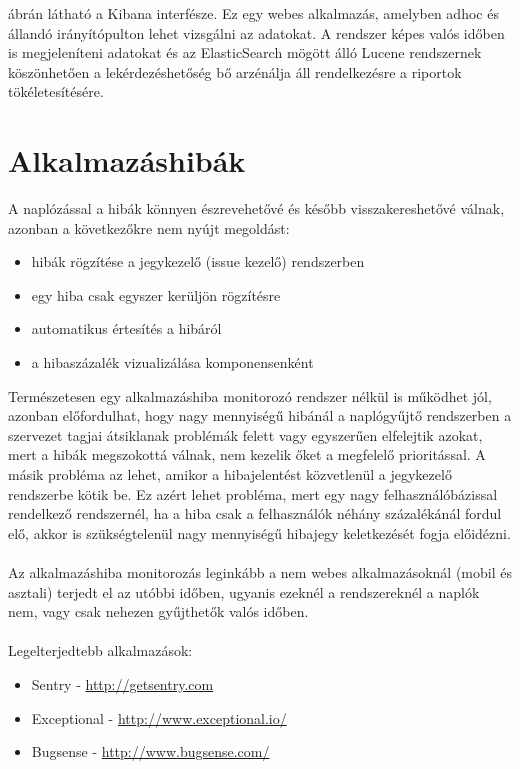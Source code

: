  ábrán látható a Kibana interfésze. Ez egy webes alkalmazás, amelyben adhoc és állandó irányítópulton lehet vizsgálni az adatokat. A rendszer képes valós időben is megjeleníteni adatokat és az ElasticSearch mögött álló Lucene rendszernek köszönhetően a lekérdezéshetőség bő arzénálja áll rendelkezésre a riportok tökéletesítésére.

\section{Alkalmazáshibák}
A naplózással a hibák könnyen észrevehetővé és később visszakereshetővé válnak, azonban a következőkre nem nyújt megoldást:\\
\begin{itemize}
\item hibák rögzítése a jegykezelő (issue kezelő) rendszerben
\item egy hiba csak egyszer kerüljön rögzítésre
\item automatikus értesítés a hibáról
\item a hibaszázalék vizualizálása komponensenként
\end{itemize}

Természetesen egy alkalmazáshiba monitorozó rendszer nélkül is működhet jól, azonban előfordulhat, hogy nagy mennyiségű hibánál a naplógyűjtő rendszerben a szervezet tagjai átsiklanak problémák felett vagy egyszerűen elfelejtik azokat, mert a hibák megszokottá válnak, nem kezelik őket a megfelelő prioritással. A másik probléma az lehet, amikor a hibajelentést közvetlenül a jegykezelő rendszerbe kötik be. Ez azért lehet probléma, mert egy nagy felhasználóbázissal rendelkező rendszernél, ha a hiba csak a felhasználók néhány százalékánál fordul elő, akkor is szükségtelenül nagy mennyiségű hibajegy keletkezését fogja előidézni.\\
\hfill\\
Az alkalmazáshiba monitorozás leginkább a nem webes alkalmazásoknál (mobil és asztali) terjedt el az utóbbi időben, ugyanis ezeknél a rendszereknél a naplók nem, vagy csak nehezen gyűjthetők valós időben.\\
\hfill\\
Legelterjedtebb alkalmazások:
\begin{itemize}
\item Sentry - \url{http://getsentry.com}
\item Exceptional - \url{http://www.exceptional.io/}
\item Bugsense - \url{http://www.bugsense.com/}
\end{itemize}

